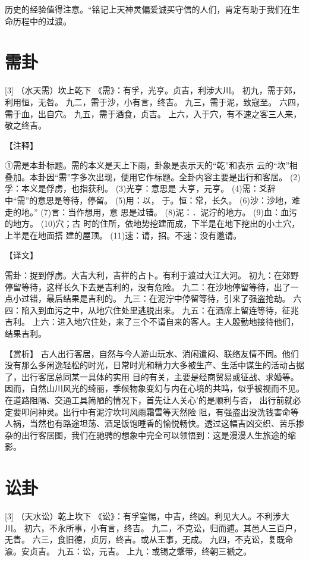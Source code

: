 \documentclass[12pt,UTF8]{ctexbook}
\begin{document}
历史的经验值得注意。“铭记上天神灵偏爱诚买守信的人们，肯定有助于我们在生命历程中的过渡。

\chapter{需卦}
[3]
（水天需）坎上乾下
《需》：有孚，光亨。贞吉，利涉大川。
初九，需于郊，利用恒，无咎。
九二，需于沙，小有言，终吉。
九三，需于泥，致寇至。
六四，需于血，出自穴。
九五，需于酒食，贞吉。
上六，入于穴，有不速之客三人来，敬之终吉。

【注释】

①需是本卦标题。需的本义是天上下雨，卦象是表示天的“乾”和表示 云的“坎”相叠加。本卦因“需”字多次出现，便用它作标题。全卦内容主要是出行和客居。
(2)孚：本义是俘虏，也指获利。
(3)光亨：意思是 大亨，元亨。
(4)需：爻辞中“需”的意思是等待，停留。
(5)用：以， 于。恒：常，长久。
(6)沙：沙地，难走的地。”
(7)言：当作想用，意 思是过错。
(8)泥：．泥泞的地方。
(9)血：血污的地方。
(10)穴；古 时的住所，依地势挖建而成，下半是在地下挖出的小土穴，上半是在地面搭 建的屋顶。
(11)速：请，招。不速：没有邀请。

【译文】

需卦：捉到俘虏。大吉大利，吉祥的占卜。有利于渡过大江大河。
初九：在郊野停留等待，这样长久下去是吉利的，没有危险。
九二：在沙地停留等待，出了一点小过错，最后结果是吉利的。
九三：在泥泞中停留等待，引来了强盗抢劫。
六四：陷入到血污之中，从地穴住处里逃脱出来。
九五：在酒席上留连等待，征兆吉利。
上六：进入地穴住处，来了三个不请自来的客人。主人殷勤地接待他们，结果吉利。

【赏析】
古人出行客居，自然与今人游山玩水、消闲遣闷、联络友情不同。他们没有那么多闲逸轻松的时光，日常时光和精力大多被生产、生活中谋生的活动占据了，出行客居总同某一具体的实用 目的有关，主要是经商贸易或征战、求婚等。因而，自然山川风光的绮丽，季候物象变幻与内在心境的共鸣，似乎被视而不见。在道路阻隔、交通工具简陋的情况下，首先让人关心’的是顺利与否， 出行前就必定要叩问神灵。出行中有泥泞坎坷风雨霜雪等天然险 阻，有强盗出没洗钱害命等人祸，当然也有路途坦荡、酒足饭饱睡香的愉悦畅快。透过这幅吉凶交织、苦乐掺杂的出行客居图，我们在驰骋的想象中完全可以领悟到：这是漫漫人生旅途的缩影。 

\chapter{讼卦}
[3]
（天水讼）乾上坎下
《讼》：有孚窒惕，中吉，终凶。利见大人。不利涉大川。
初六，不永所事，小有言，终吉。
九二，不克讼，归而逋。其邑人三百户，无眚。
六三，食旧德，贞厉，终吉。或从王事，无成。
九四，不克讼，复既命渝。安贞吉。
九五：讼，元吉。
上九：或锡之鞶带，终朝三褫之。
\end{document}
